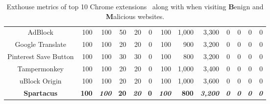 {\begin{table*}[t]
{\begin{tabular}{crrrrrrrrrrrr}
\rowcolor[HTML]{C0C0C0} 
AdBlock                         & 100                   & 100                   & 50                    & 20                    & 0                       & 100                     & 1,000                 & 3,300                   & 0                       & 0                       & 0                       & 0                      \\
\rowcolor[HTML]{EFEFEF} 
Google Translate                & 100                   & 100                   & 20                    & 20                    & 0                       & 100                     & 900                   & 3,200                   & 0                       & 0                       & 0                       & 0                      \\
\rowcolor[HTML]{C0C0C0} 
Pinterest Save Button           & 100                   & 100                   & 30                    & 30                    & 0                       & 100                     & 800                   & 3,200                   & 0                       & 0                       & 0                       & 0                      \\
\rowcolor[HTML]{EFEFEF} 
Tampermonkey                    & 100                   & 100                   & 20                    & 20                    & 0                       & 100                     & 1,000                 & 3,400                   & 0                       & 0                       & 0                       & 0                      \\
\rowcolor[HTML]{C0C0C0} 
uBlock Origin                   & 100                   & 100                   & 20                    & 20                    & 0                       & 100                     & 1,000                 & 3,600                   & 0                       & 0                       & 0                       & 0                      \\ \midrule
\textbf{Spartacus}              & \textbf{100}          & \textit{\textbf{100}} & \textbf{20}           & \textit{\textbf{20}}  & \textbf{0}              & \textit{\textbf{100}}   & \textbf{800}          & \textit{\textbf{3,200}} & \textit{\textbf{0}}     & \textit{\textbf{0}}     & \textit{\textbf{0}}     & \textit{\textbf{0}}    \\ \bottomrule
\end{tabular}
}
\caption{Exthouse metrics of top 10 Chrome extensions~\cite{exthouse} along with \spartacus when visiting \textbf{B}enign and \textbf{M}alicious websites.}
\label{tab:exthouse}
\end{table*}
}


